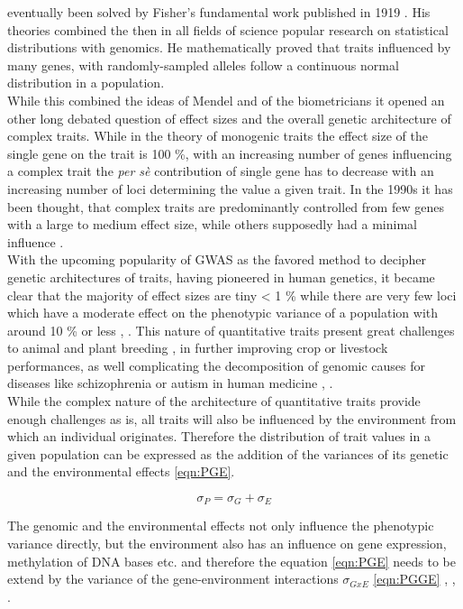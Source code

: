 eventually been solved by Fisher's fundamental work published in 1919 \cite{fisher1919xv}. His theories
combined the then in all fields of science popular research on statistical distributions with genomics. He
mathematically proved that traits influenced by many genes, with randomly-sampled alleles follow a continuous
normal distribution in a population. \\ While this combined the ideas of Mendel and of the biometricians
it opened an other long debated question of effect sizes and the overall genetic architecture of complex
traits. While in the theory of monogenic traits the effect size of the single gene on the trait is 100 \%,
with an increasing number of genes influencing a complex trait the \textit{per sè} contribution of single gene
has to decrease with an increasing number of loci determining the value a given trait. In the 1990s it has
been thought, that complex traits are predominantly controlled from few genes with a large to medium effect
size, while others supposedly had a minimal influence
\cite{zhang2018esti}. \\
With the upcoming popularity of GWAS as the favored method to decipher genetic architectures of traits, having
pioneered in human genetics, it became clear that the majority of effect sizes are tiny < 1 \% while there
are very few loci which have a moderate effect on the phenotypic variance of a population with around 10 \% or
less \cite{korte2013advantages}, \cite{stringer2011}. This nature of quantitative traits present great
challenges to animal \cite{goddard2009} and plant breeding \cite{wurschum2012}, in further improving crop or
livestock performances, as well complicating the decomposition of genomic causes for diseases like
schizophrenia or autism in human medicine \cite{de2014}, \cite{purcell2014}. \\
While the complex nature of the architecture of quantitative traits provide enough challenges as is, all
traits will also be influenced by the environment from which an individual originates. Therefore the
distribution of trait values in a given population can be expressed as the addition of the variances of its
genetic and the environmental effects \ref{eqn:PGE}.

\begin{equation}
 \sigma_{P} = \sigma_{G} + \sigma_{E}
 \label{eqn:PGE}
\end{equation}


The genomic and the environmental effects not only influence the phenotypic variance directly, but the
environment also has an influence on gene expression, methylation of DNA bases etc. and therefore the equation
\ref{eqn:PGE} needs to be extend by the variance of the gene-environment interactions $\sigma_{GxE}$
\ref{eqn:PGGE} , \cite{lynch1998}, \cite{walsh2018}.
    
